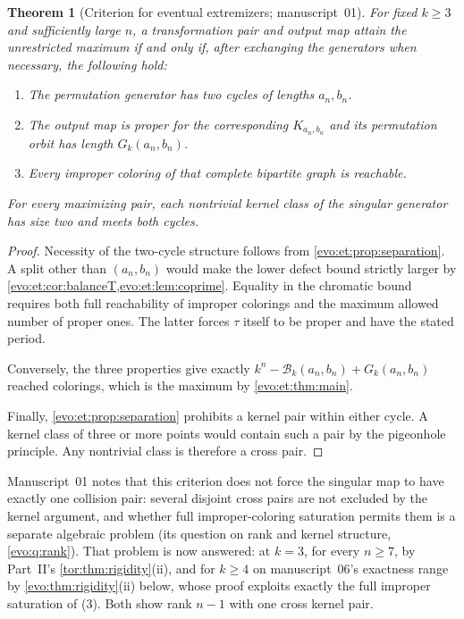 \documentclass[11pt,a4paper]{article}
\numberwithin{equation}{section}
\newtheorem{theorem}{Theorem}[section]
\theoremstyle{definition}
\theoremstyle{remark}
\newcommand{\Bip}{\mathcal B}
\begin{document}
\begin{theorem}[Criterion for eventual extremizers; manuscript~01]\label{evo:et:thm:extremizers}
For fixed $k\ge3$ and sufficiently large $n$, a transformation pair and output
map attain the unrestricted maximum if and only if, after exchanging the
generators when necessary, the following hold:
\begin{enumerate}
\item The permutation generator has two cycles of lengths $a_n,b_n$.
\item The output map is proper for the corresponding $K_{a_n,b_n}$ and its
permutation orbit has length $G_k(a_n,b_n)$.
\item Every improper coloring of that complete bipartite graph is reachable.
\end{enumerate}
For every maximizing pair, each nontrivial kernel class of the singular
generator has size two and meets both cycles.
\end{theorem}
\begin{proof}
Necessity of the two-cycle structure follows from
\cref{evo:et:prop:separation}. A split other than $(a_n,b_n)$ would make the
lower defect bound strictly larger by
\cref{evo:et:cor:balanceT,evo:et:lem:coprime}. Equality in the chromatic bound
requires both full reachability of improper colorings and the maximum allowed
number of proper ones. The latter forces $\tau$ itself to be proper and have
the stated period.

Conversely, the three properties give exactly
$k^n-\Bip_k(a_n,b_n)+G_k(a_n,b_n)$ reached colorings, which is the maximum by
\cref{evo:et:thm:main}.

Finally, \cref{evo:et:prop:separation} prohibits a kernel pair within either
cycle. A kernel class of three or more points would contain such a pair by
the pigeonhole principle. Any nontrivial class is therefore a cross pair.
\end{proof}

Manuscript~01 notes that this criterion does not force the singular map to
have exactly one collision pair: several disjoint cross pairs are not excluded
by the kernel argument, and whether full improper-coloring saturation permits
them is a separate algebraic problem (its question on rank and kernel
structure, \cref{evo:q:rank}). That problem is now answered: at $k=3$, for
every $n\ge7$, by Part~II's \cref{tor:thm:rigidity}(ii), and for $k\ge4$ on
manuscript~06's exactness range by \cref{evo:thm:rigidity}(ii) below, whose
proof exploits exactly the full improper saturation of (3). Both show rank
$n-1$ with one cross kernel pair.
\end{document}

